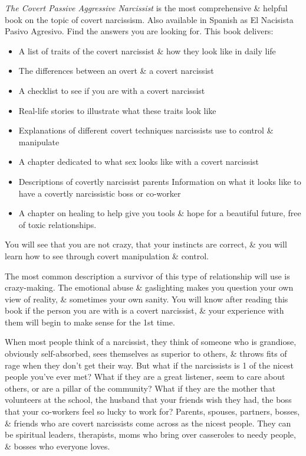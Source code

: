 \documentclass{article}
\begin{document}
\begin{enumerate}
	{\it The Covert Passive Aggressive Narcissist} is the most comprehensive \& helpful book on the topic of covert narcissism. Also available in Spanish as El Nacisista Pasivo Agresivo. Find the answers you are looking for. This book delivers:
	\begin{itemize}
		\item A list of traits of the covert narcissist \& how they look like in daily life
		\item The differences between an overt \& a covert narcissist
		\item A checklist to see if you are with a covert narcissist
		\item Real-life stories to illustrate what these traits look like
		\item Explanations of different covert techniques narcissists use to control \& manipulate
		\item A chapter dedicated to what sex looks like with a covert narcissist
		\item Descriptions of covertly narcissist parents Information on what it looks like to have a covertly narcissistic boss or co-worker
		\item A chapter on healing to help give you tools \& hope for a beautiful future, free of toxic relationships.
	\end{itemize}
	You will see that you are not crazy, that your instincts are correct, \& you will learn how to see through covert manipulation \& control.

	The most common description a survivor of this type of relationship will use is crazy-making. The emotional abuse \& gaslighting makes you question your own view of reality, \& sometimes your own sanity. You will know after reading this book if the person you are with is a covert narcissist, \& your experience with them will begin to make sense for the 1st time.

	When most people think of a narcissist, they think of someone who is grandiose, obviously self-absorbed, sees themselves as superior to others, \& throws fits of rage when they don't get their way. But what if the narcissists is 1 of the nicest people you've ever met? What if they are a great listener, seem to care about others, or are a pillar of the community? What if they are the mother that volunteers at the school, the husband that your friends wish they had, the boss that your co-workers feel so lucky to work for? Parents, spouses, partners, bosses, \& friends who are covert narcissists come across as the nicest people. They can be spiritual leaders, therapists, moms who bring over casseroles to needy people, \& bosses who everyone loves.


\end{enumerate}
\end{document}
